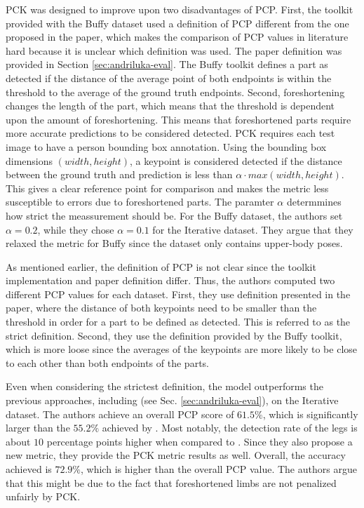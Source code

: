 PCK was designed to improve upon two disadvantages of PCP.
First, the toolkit provided with the Buffy dataset \cite{ferrari_progressive_2008} used a definition of PCP different from the one proposed in the paper, which makes the comparison of PCP values in literature hard because it is unclear which definition was used.
The paper definition was provided in Section \ref{sec:andriluka-eval}.
The Buffy toolkit defines a part as detected if the distance of the average point of both endpoints is within the threshold to the average of the ground truth endpoints.
Second, foreshortening changes the length of the part, which means that the threshold is dependent upon the amount of foreshortening.
This means that foreshortened parts require more accurate predictions to be considered detected.
PCK requires each test image to have a person bounding box annotation.
Using the bounding box dimensions $(width, height)$, a keypoint is considered detected if the distance between the ground truth and prediction is less than $\alpha \cdot max(width, height)$.
This gives a clear reference point for comparison and makes the metric less susceptible to errors due to foreshortened parts.
The paramter $\alpha$ determmines how strict the meassurement should be.
For the Buffy dataset, the authors set $\alpha = 0.2$, while they chose $\alpha = 0.1$ for the Iterative dataset.
They argue that they relaxed the metric for Buffy since the dataset only contains upper-body poses.

As mentioned earlier, the definition of PCP is not clear since the toolkit implementation and paper definition differ.
Thus, the authors computed two different PCP values for each dataset.
First, they use definition presented in the paper, where the distance of both keypoints need to be smaller than the threshold in order for a part to be defined as detected.
This is referred to as the strict definition.
Second, they use the definition provided by the Buffy toolkit, which is more loose since the averages of the keypoints are more likely to be close to each other than both endpoints of the parts.

Even when considering the strictest definition, the model outperforms the previous approaches, including \cite{andriluka_pictorial_2009} (see Sec. \ref{sec:andriluka-eval}), on the Iterative dataset.
The authors achieve an overall PCP score of $61.5\%$, which is significantly larger than the $55.2\%$ achieved by \cite{andriluka_pictorial_2009}.
Most notably, the detection rate of the legs is about $10$ percentage points higher when compared to \cite{andriluka_pictorial_2009}.
Since they also propose a new metric, they provide the PCK metric results as well.
Overall, the accuracy achieved is $72.9\%$, which is higher than the overall PCP value.
The authors argue that this might be due to the fact that foreshortened limbs are not penalized unfairly by PCK. 

